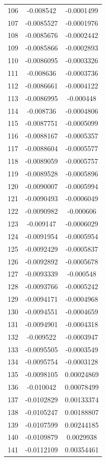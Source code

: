 \documentclass[a4paper, 11pt, oneside]{report}
\begin{document}
{\begin{longtable}{|c|c|c|}
106 & -0.008542  & -0.0001499 \\
107 & -0.0085527 & -0.0001976 \\
108 & -0.0085676 & -0.0002442 \\
109 & -0.0085866 & -0.0002893 \\
110 & -0.0086095 & -0.0003326 \\
111 & -0.008636  & -0.0003736 \\
112 & -0.0086661 & -0.0004122 \\
113 & -0.0086995 & -0.000448  \\
114 & -0.008736  & -0.0004806 \\
115 & -0.0087751 & -0.0005099 \\
116 & -0.0088167 & -0.0005357 \\
117 & -0.0088604 & -0.0005577 \\
118 & -0.0089059 & -0.0005757 \\
119 & -0.0089528 & -0.0005896 \\
120 & -0.0090007 & -0.0005994 \\
121 & -0.0090493 & -0.0006049 \\
122 & -0.0090982 & -0.000606  \\
123 & -0.009147  & -0.0006029 \\
124 & -0.0091954 & -0.0005954 \\
125 & -0.0092429 & -0.0005837 \\
126 & -0.0092892 & -0.0005678 \\
127 & -0.0093339 & -0.000548  \\
128 & -0.0093766 & -0.0005242 \\
129 & -0.0094171 & -0.0004968 \\
130 & -0.0094551 & -0.0004659 \\
131 & -0.0094901 & -0.0004318 \\
132 & -0.009522  & -0.0003947 \\
133 & -0.0095505 & -0.0003549 \\
134 & -0.0095754 & -0.0003128 \\
135 & -0.0098105 & 0.00024869 \\
136 & -0.010042  & 0.00078499 \\
137 & -0.0102829 & 0.00133374 \\
138 & -0.0105247 & 0.00188807 \\
139 & -0.0107599 & 0.00244185 \\
140 & -0.0109879 & 0.0029938  \\
141 & -0.0112109 & 0.00354461 \\

\end{longtable}}
\end{document}
